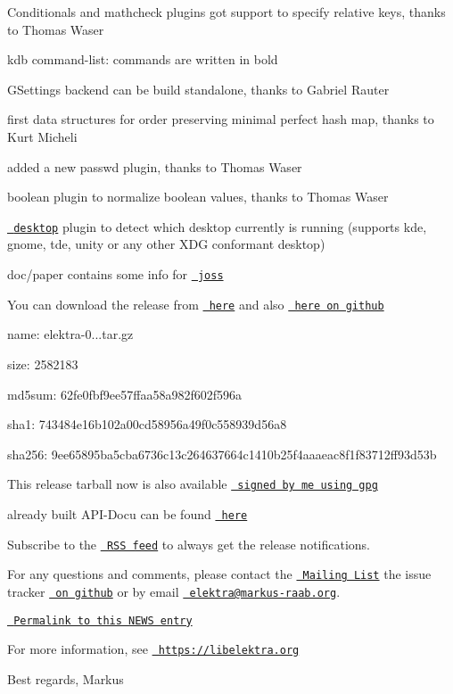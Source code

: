\begin{DoxyItemize}
\item Conditionals and mathcheck plugins got support to specify relative keys, thanks to Thomas Waser
\item {\ttfamily kdb} command-\/list\+: commands are written in bold
\item G\+Settings backend can be build standalone, thanks to Gabriel Rauter
\item first data structures for order preserving minimal perfect hash map, thanks to Kurt Micheli
\item added a new passwd plugin, thanks to Thomas Waser
\item boolean plugin to normalize boolean values, thanks to Thomas Waser
\item \href{https://master.libelektra.org/src/plugins/desktop}{\texttt{ desktop}} plugin to detect which desktop currently is running (supports kde, gnome, tde, unity or any other X\+DG conformant desktop)
\item {\ttfamily doc/paper} contains some info for \href{https://github.com/openjournals/joss}{\texttt{ joss}}
\end{DoxyItemize}

You can download the release from \href{https://www.libelektra.org/ftp/elektra/releases/elektra-0.8.18.tar.gz}{\texttt{ here}} and also \href{https://github.com/ElektraInitiative/ftp/tree/master/releases/elektra-0.8.18.tar.gz}{\texttt{ here on github}}


\begin{DoxyItemize}
\item name\+: elektra-\/0...\+tar.\+gz
\item size\+: 2582183
\item md5sum\+: 62fe0fbf9ee57ffaa58a982f602f596a
\item sha1\+: 743484e16b102a00cd58956a49f0c558939d56a8
\item sha256\+: 9ee65895ba5cba6736c13c264637664c1410b25f4aaaeac8f1f83712ff93d53b
\end{DoxyItemize}

This release tarball now is also available \href{https://www.libelektra.org/ftp/elektra/releases/elektra-0.8.18.tar.gz.gpg}{\texttt{ signed by me using gpg}}

already built A\+P\+I-\/\+Docu can be found \href{https://doc.libelektra.org/api/0.8.18/html/}{\texttt{ here}}

Subscribe to the \href{https://doc.libelektra.org/news/feed.rss}{\texttt{ R\+SS feed}} to always get the release notifications.

For any questions and comments, please contact the \href{https://lists.sourceforge.net/lists/listinfo/registry-list}{\texttt{ Mailing List}} the issue tracker \href{https://git.libelektra.org/issues}{\texttt{ on github}} or by email \href{mailto:elektra@markus-raab.org}{\texttt{ elektra@markus-\/raab.\+org}}.

\href{https://doc.libelektra.org/news/190576e0-9fef-486e-b8da-c4e75be08329.html}{\texttt{ Permalink to this N\+E\+WS entry}}

For more information, see \href{https://libelektra.org}{\texttt{ https\+://libelektra.\+org}}

Best regards, Markus 